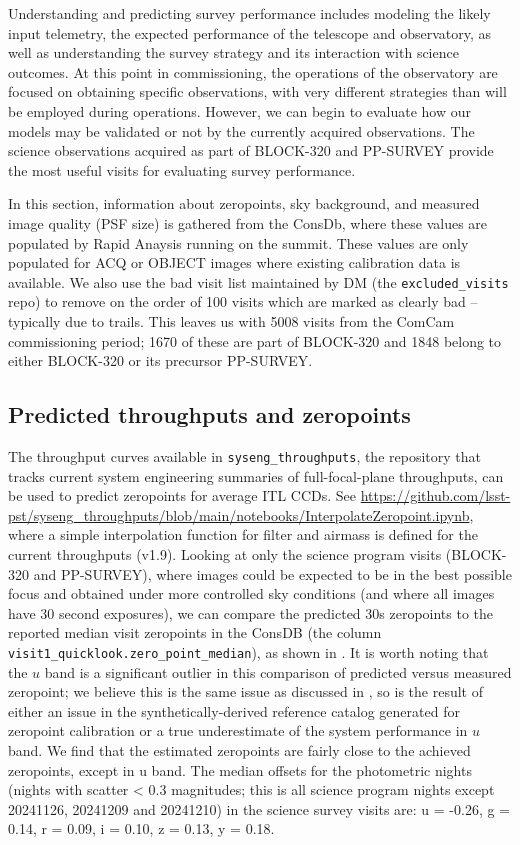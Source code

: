 Understanding and predicting survey performance includes modeling the likely input telemetry, the expected performance of the telescope and observatory, as well as understanding the survey strategy and its interaction with science outcomes. At this point in commissioning, the operations of the observatory are focused on obtaining specific observations, with very different strategies than will be employed during operations.  However, we can begin to evaluate how our models may be validated or not by the currently acquired observations. The science observations acquired as part of BLOCK-320  and PP-SURVEY provide the most useful visits for evaluating survey performance. 

In this section, information about zeropoints, sky background, and measured image quality (PSF size) is gathered from the ConsDb, where these values are populated by Rapid Anaysis running on the summit. These values are only populated for ACQ or OBJECT images where existing calibration data is available. We also use the bad visit list maintained by DM (the \texttt{excluded\_visits} repo) to remove on the order of 100 visits which are marked as clearly bad -- typically due to trails. This leaves us with 5008 visits from the ComCam commissioning period; 1670 of these are part of BLOCK-320 and 1848 belong to either BLOCK-320 or its precursor PP-SURVEY.

\subsection{Predicted throughputs and zeropoints}

The throughput curves available in \texttt{syseng\_throughputs}, the repository that tracks current system engineering summaries of full-focal-plane throughputs, can be used to predict zeropoints for average ITL CCDs. See \url{https://github.com/lsst-pst/syseng\_throughputs/blob/main/notebooks/InterpolateZeropoint.ipynb}, where a simple interpolation function for filter and airmass is defined for the current throughputs (v1.9).  Looking at only the science program visits (BLOCK-320 and PP-SURVEY), where images could be expected to be in the best possible focus and obtained under more controlled sky conditions (and where all images have 30 second exposures), we can compare the predicted 30s zeropoints to the reported median visit zeropoints in the ConsDB (the column \texttt{visit1\_quicklook.zero\_point\_median}), as shown in . It is worth noting that the $u$ band is a significant outlier in this comparison of predicted versus measured zeropoint; we believe this is the same issue as discussed in , so is the result of either an issue in the synthetically-derived reference catalog generated for zeropoint calibration or a true underestimate of the system performance in $u$ band.  We find that the estimated zeropoints are fairly close to the achieved zeropoints, except in u band. The median offsets for the photometric nights (nights with scatter < 0.3 magnitudes; this is all science program nights except 20241126, 20241209 and 20241210) in the science survey visits are:  u = -0.26, g = 0.14, r = 0.09, i = 0.10, z = 0.13, y = 0.18. 

